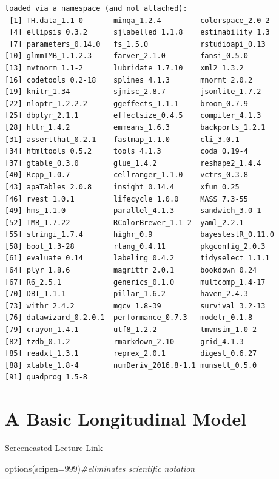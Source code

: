 \documentclass[
  11pt,
]{book}
\newenvironment{Shaded}{\begin{snugshade}}{\end{snugshade}}
\newcommand{\AttributeTok}[1]{\textcolor[rgb]{0.77,0.63,0.00}{#1}}
\newcommand{\CommentTok}[1]{\textcolor[rgb]{0.56,0.35,0.01}{\textit{#1}}}
\newcommand{\DecValTok}[1]{\textcolor[rgb]{0.00,0.00,0.81}{#1}}
\newcommand{\FunctionTok}[1]{\textcolor[rgb]{0.00,0.00,0.00}{#1}}
\newcommand{\NormalTok}[1]{#1}
\begin{document}
\begin{verbatim}
loaded via a namespace (and not attached):
 [1] TH.data_1.1-0       minqa_1.2.4         colorspace_2.0-2   
 [4] ellipsis_0.3.2      sjlabelled_1.1.8    estimability_1.3   
 [7] parameters_0.14.0   fs_1.5.0            rstudioapi_0.13    
[10] glmmTMB_1.1.2.3     farver_2.1.0        fansi_0.5.0        
[13] mvtnorm_1.1-2       lubridate_1.7.10    xml2_1.3.2         
[16] codetools_0.2-18    splines_4.1.3       mnormt_2.0.2       
[19] knitr_1.34          sjmisc_2.8.7        jsonlite_1.7.2     
[22] nloptr_1.2.2.2      ggeffects_1.1.1     broom_0.7.9        
[25] dbplyr_2.1.1        effectsize_0.4.5    compiler_4.1.3     
[28] httr_1.4.2          emmeans_1.6.3       backports_1.2.1    
[31] assertthat_0.2.1    fastmap_1.1.0       cli_3.0.1          
[34] htmltools_0.5.2     tools_4.1.3         coda_0.19-4        
[37] gtable_0.3.0        glue_1.4.2          reshape2_1.4.4     
[40] Rcpp_1.0.7          cellranger_1.1.0    vctrs_0.3.8        
[43] apaTables_2.0.8     insight_0.14.4      xfun_0.25          
[46] rvest_1.0.1         lifecycle_1.0.0     MASS_7.3-55        
[49] hms_1.1.0           parallel_4.1.3      sandwich_3.0-1     
[52] TMB_1.7.22          RColorBrewer_1.1-2  yaml_2.2.1         
[55] stringi_1.7.4       highr_0.9           bayestestR_0.11.0  
[58] boot_1.3-28         rlang_0.4.11        pkgconfig_2.0.3    
[61] evaluate_0.14       labeling_0.4.2      tidyselect_1.1.1   
[64] plyr_1.8.6          magrittr_2.0.1      bookdown_0.24      
[67] R6_2.5.1            generics_0.1.0      multcomp_1.4-17    
[70] DBI_1.1.1           pillar_1.6.2        haven_2.4.3        
[73] withr_2.4.2         mgcv_1.8-39         survival_3.2-13    
[76] datawizard_0.2.0.1  performance_0.7.3   modelr_0.1.8       
[79] crayon_1.4.1        utf8_1.2.2          tmvnsim_1.0-2      
[82] tzdb_0.1.2          rmarkdown_2.10      grid_4.1.3         
[85] readxl_1.3.1        reprex_2.0.1        digest_0.6.27      
[88] xtable_1.8-4        numDeriv_2016.8-1.1 munsell_0.5.0      
[91] quadprog_1.5-8     
\end{verbatim}

\hypertarget{LongMod}{%
\chapter{A Basic Longitudinal Model}\label{LongMod}}

\href{https://spu.hosted.panopto.com/Panopto/Pages/Viewer.aspx?pid=dedb85c8-e442-49bf-8f92-ad31018b1dd8}{Screencasted Lecture Link}

\begin{Shaded}
\begin{Highlighting}[]
\FunctionTok{options}\NormalTok{(}\AttributeTok{scipen=}\DecValTok{999}\NormalTok{)}\CommentTok{\#eliminates scientific notation}
\end{Highlighting}
\end{Shaded}
\end{document}
